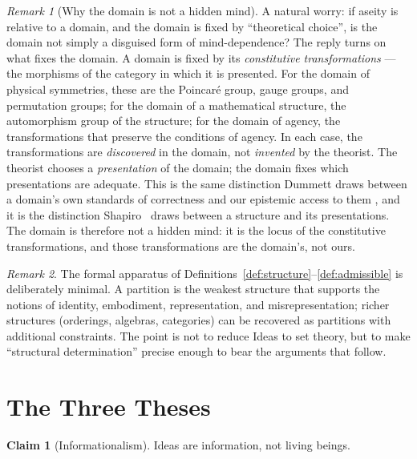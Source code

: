 \documentclass[11pt,a4paper]{article}
\theoremstyle{definition}
\newtheorem{claim}{Claim}[section]
\theoremstyle{remark}
\newtheorem{remark}{Remark}[section]
\begin{document}
\begin{remark}[Why the domain is not a hidden mind]
\label{rem:domain-not-mind}
A natural worry: if aseity is relative to a domain, and the domain is
fixed by ``theoretical choice'', is the domain not simply a disguised
form of mind-dependence? The reply turns on what fixes the domain.
A domain is fixed by its \emph{constitutive transformations} --- the
morphisms of the category in which it is presented. For the domain of
physical symmetries, these are the Poincaré group, gauge groups, and
permutation groups; for the domain of a mathematical structure, the
automorphism group of the structure; for the domain of agency, the
transformations that preserve the conditions of agency. In each case,
the transformations are \emph{discovered} in the domain, not
\emph{invented} by the theorist. The theorist chooses a
\emph{presentation} of the domain; the domain fixes which
presentations are adequate. This is the same distinction Dummett draws
between a domain's own standards of correctness and our epistemic
access to them \cite{Dummett1978}, and it is the distinction
Shapiro~\cite{Shapiro1997} draws between a structure and its
presentations. The domain is therefore not a hidden mind: it is the
locus of the constitutive transformations, and those transformations
are the domain's, not ours.
\end{remark}

\begin{remark}
The formal apparatus of Definitions~\ref{def:structure}--\ref{def:admissible}
is deliberately minimal. A partition is the weakest structure that
supports the notions of identity, embodiment, representation, and
misrepresentation; richer structures (orderings, algebras, categories)
can be recovered as partitions with additional constraints. The point
is not to reduce Ideas to set theory, but to make ``structural
determination'' precise enough to bear the arguments that follow.
\end{remark}

\section{The Three Theses}

\begin{claim}[Informationalism]
Ideas are information, not living beings.
\end{claim}
\end{document}
